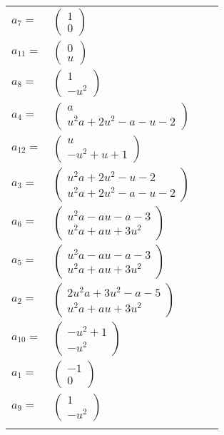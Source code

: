 \documentclass[1p]{elsarticle_modified}
\theoremstyle{definition}
\begin{document}
\begin{tabular}{m{7pt} m{180pt} m{7pt} m{180pt} }
\flushright $a_{7}=$&$\begin{pmatrix}1\\0\end{pmatrix}$ \\
\flushright $a_{11}=$&$\begin{pmatrix}0\\u\end{pmatrix}$ \\
\flushright $a_{8}=$&$\begin{pmatrix}1\\- u^2\end{pmatrix}$ \\
\flushright $a_{4}=$&$\begin{pmatrix}a\\u^2 a+2 u^2- a- u-2\end{pmatrix}$ \\
\flushright $a_{12}=$&$\begin{pmatrix}u\\- u^2+u+1\end{pmatrix}$ \\
\flushright $a_{3}=$&$\begin{pmatrix}u^2 a+2 u^2- u-2\\u^2 a+2 u^2- a- u-2\end{pmatrix}$ \\
\flushright $a_{6}=$&$\begin{pmatrix}u^2 a- a u- a-3\\u^2 a+a u+3 u^2\end{pmatrix}$ \\
\flushright $a_{5}=$&$\begin{pmatrix}u^2 a- a u- a-3\\u^2 a+a u+3 u^2\end{pmatrix}$ \\
\flushright $a_{2}=$&$\begin{pmatrix}2 u^2 a+3 u^2- a-5\\u^2 a+a u+3 u^2\end{pmatrix}$ \\
\flushright $a_{10}=$&$\begin{pmatrix}- u^2+1\\- u^2\end{pmatrix}$ \\
\flushright $a_{1}=$&$\begin{pmatrix}-1\\0\end{pmatrix}$ \\
\flushright $a_{9}=$&$\begin{pmatrix}1\\- u^2\end{pmatrix}$\\&\end{tabular}
\end{document}
